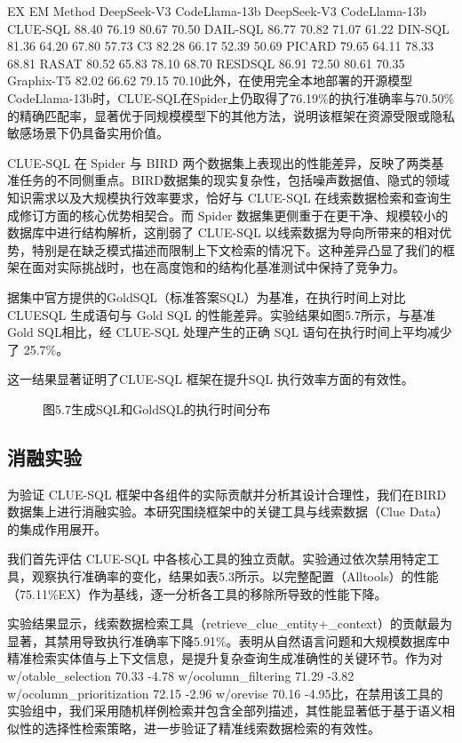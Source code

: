 \documentclass[12pt,a4paper,openright,UTF8]{ctexbook}
\begin{document}
EX EM Method DeepSeek-V3 CodeLlama-13b DeepSeek-V3 CodeLlama-13b CLUE-SQL 88.40 76.19 80.67 70.50 DAIL-SQL 86.77 70.82 71.07 61.22 DIN-SQL 81.36 64.20 67.80 57.73 C3 82.28 66.17 52.39 50.69 PICARD 79.65 64.11 78.33 68.81 RASAT 80.52 65.83 78.10 68.70 RESDSQL 86.91 72.50 80.61 70.35 Graphix-T5 82.02 66.62 79.15 70.10此外，在使用完全本地部署的开源模型CodeLlama-13b时，CLUE-SQL在Spider上仍取得了76.19\%的执行准确率与70.50\%的精确匹配率，显著优于同规模模型下的其他方法，说明该框架在资源受限或隐私敏感场景下仍具备实用价值。


CLUE-SQL 在 Spider 与 BIRD 两个数据集上表现出的性能差异，反映了两类基准任务的不同侧重点。BIRD数据集的现实复杂性，包括噪声数据值、隐式的领域知识需求以及大规模执行效率要求，恰好与 CLUE-SQL 在线索数据检索和查询生成修订方面的核心优势相契合。而 Spider 数据集更侧重于在更干净、规模较小的数据库中进行结构解析，这削弱了 CLUE-SQL 以线索数据为导向所带来的相对优势，特别是在缺乏模式描述而限制上下文检索的情况下。这种差异凸显了我们的框架在面对实际挑战时，也在高度饱和的结构化基准测试中保持了竞争力。


据集中官方提供的GoldSQL（标准答案SQL）为基准，在执行时间上对比CLUESQL 生成语句与 Gold SQL 的性能差异。实验结果如图5.7所示，与基准 Gold SQL相比，经 CLUE-SQL 处理产生的正确 SQL 语句在执行时间上平均减少了 25.7\%。


这一结果显著证明了CLUE-SQL 框架在提升SQL 执行效率方面的有效性。

\begin{figure}[htbp]
\centering
{}
\caption{图5.7生成SQL和GoldSQL的执行时间分布}
\end{figure}


\subsection{消融实验}

为验证 CLUE-SQL 框架中各组件的实际贡献并分析其设计合理性，我们在BIRD 数据集上进行消融实验。本研究围绕框架中的关键工具与线索数据（Clue Data）的集成作用展开。


我们首先评估 CLUE-SQL 中各核心工具的独立贡献。实验通过依次禁用特定工具，观察执行准确率的变化，结果如表5.3所示。以完整配置（Alltools）的性能（75.11\%EX）作为基线，逐一分析各工具的移除所导致的性能下降。


实验结果显示，线索数据检索工具（retrieve\_clue\_entity+\_context）的贡献最为显著，其禁用导致执行准确率下降5.91\%。表明从自然语言问题和大规模数据库中精准检索实体值与上下文信息，是提升复杂查询生成准确性的关键环节。作为对w/otable\_selection 70.33 -4.78 w/ocolumn\_filtering 71.29 -3.82 w/ocolumn\_prioritization 72.15 -2.96 w/orevise 70.16 -4.95比，在禁用该工具的实验组中，我们采用随机样例检索并包含全部列描述，其性能显著低于基于语义相似性的选择性检索策略，进一步验证了精准线索数据检索的有效性。
\end{document}
